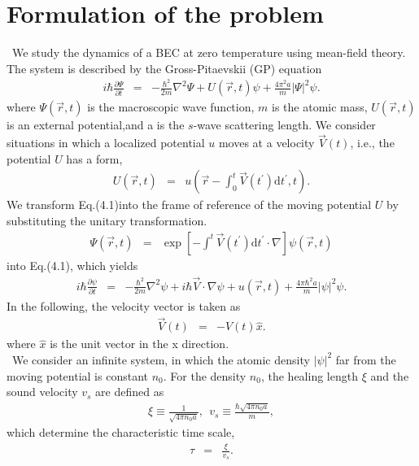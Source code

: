 \documentclass[12pt,a4paper]{report}
\newcommand{\diff}{\mathrm{d}}				            %
\begin{document}
\section{Formulation of the problem}
\ We study the dynamics of a BEC at zero temperature
using mean-field theory. The system is described by the
Gross-Pitaevskii (GP) equation
\begin{eqnarray}
i \hbar \frac{\partial \Psi}{\partial t} & = &
- \frac{\hbar^2}{2m} \nabla^2 \Psi + U(\vec{r},t)\psi + \frac{4 \pi^2 a}{m} | \Psi |^2 \psi.
\end{eqnarray}
where $\Psi(\vec{r},t)$ is the macroscopic wave function, $m$ is the
atomic mass, $U( \vec{r}, t)$ is an external potential,and a is 
the $s$-wave scattering length. We consider situations in
which a localized potential $u$ moves at a velocity $\vec{V}(t)$,
i.e., the potential $U$ has a form,
\begin{eqnarray}
U(\vec{r},t) & = & u \left( \vec{r} - \int_0^t \vec{V}(t^\prime) \diff t^\prime, t \right).
\end{eqnarray}
We transform Eq.(4.1)into the frame of reference of the
moving potential $U$ by substituting the unitary transformation.
\begin{eqnarray}
\Psi \left( \vec{r}, t \right) & = & \exp \left[ - \int^t \vec{V} \left( t^\prime \right) \diff t^\prime \cdot \nabla \right]
\psi \left( \vec{r}, t \right)
\end{eqnarray}
into Eq.(4.1), which yields
\begin{eqnarray}
i \hbar \frac{\partial \psi}{\partial t} & = &
- \frac{\hbar^2}{2m} \nabla^2 \psi + i \hbar \vec{V} \cdot \nabla \psi
+ u \left( \vec{r}, t \right) + \frac{4 \pi \hbar^2 a}{m} | \psi |^2 \psi .
\end{eqnarray}
In the following, the velocity vector is taken as
\begin{eqnarray}
\vec{V} (t) & = & - V(t) \hat{x}.
\end{eqnarray}
where $\hat{x}$ is the unit vector in the x direction.
\\
\ We consider an infinite system, in which the atomic
density $| \psi |^2$ far from the moving potential is 
constant $n_0$. For the density $n_0$, the healing length
$\xi$ and the sound velocity $v_s$ are defined as
\begin{eqnarray}
\xi \equiv \frac{1}{\sqrt{4 \pi n_0 a}}, \ \ v_s \equiv \frac{\hbar \sqrt{4 \pi n_0 a}}{m},
\end{eqnarray}
which determine the characteristic time scale,
\begin{eqnarray}
\tau & = & \frac{\xi}{v_s}.
\end{eqnarray}
\end{document}

